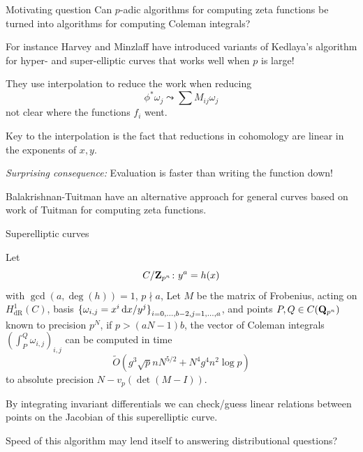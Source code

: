 \begin{frame}{Motivating question}
    Can $p$-adic algorithms for computing zeta functions be turned into algorithms for computing Coleman integrals? \pause

    For instance Harvey and Minzlaff have introduced variants of Kedlaya's algorithm for hyper- and super-elliptic curves that works well when $p$ is large!

    They use interpolation to reduce the work when reducing
    \[\phi^* \omega_j \leadsto \sum M_{ij} \omega_j\]
    not clear where the functions $f_i$ went.

    Key to the interpolation is the fact that reductions in cohomology are linear in the exponents of $x,y$.

    \emph{Surprising consequence:} Evaluation is faster than writing the function down!

    Balakrishnan-Tuitman have an alternative approach for general curves based on work of Tuitman for computing zeta functions.

\end{frame}



\begin{frame}{Superelliptic curves}
    \begin{theorem}[B.]
        Let \vspace{-13pt} $$ C/\mathbf{Z}_{p^n}\colon y^a = h(x)$$
        with $ \gcd(a,\deg(h)) = 1$, $ p\nmid a$, Let $ M$ be the matrix of Frobenius, acting on  $ H^1_\mathrm{dR}(C)$, basis $ {\{\omega_{i,j}= x^i\mathop{}\!\mathrm{d} x /y^j\}}_{i=0,\ldots, b-2,j=1,\ldots,a}$, and points $ P,Q\in C(\mathbf Q_{p^n})$ known to precision $ p^N$, if $ p \gt (aN - 1)b$, the vector of Coleman integrals $\left(\int_P^Q \omega_{i,j}\right)_{i,j}$ can be computed in time \vspace{-13pt}
        $$ \widetilde O\left(g^3 \sqrt{p}n N^{5/2} + N^4 g^4 n^2 \log p \right)$$
        to absolute precision  $ N - v_p(\det(M-I))$.
    \end{theorem}

    \pause%
    By integrating invariant differentials we can check/guess linear relations between points on the Jacobian of this superelliptic curve. \pause

    Speed of this algorithm may lend itself to answering distributional questions?

\end{frame}



